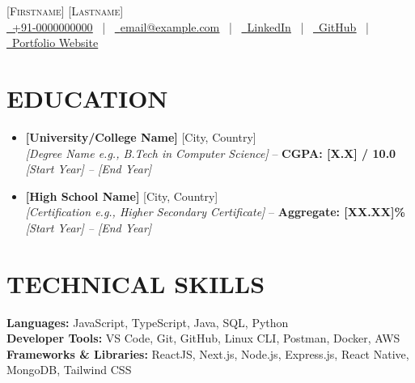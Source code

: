 \documentclass[letterpaper,11pt]{article}
\newcommand{\resumeSubHeadingListStart}{\begin{itemize}[leftmargin=0.0in, label={}]}
\newcommand{\resumeSubHeadingListEnd}{\end{itemize}}
\begin{document}
\begin{center}
    {\Huge \scshape [Firstname] [Lastname]} \\ \vspace{2pt}
    \small
    \href{tel:+910000000000}{\faPhone\ \underline{+91-0000000000}} ~|~
    \href{mailto:email@example.com}{\faEnvelope\ \underline{email@example.com}} ~|~
    \href{https://linkedin.com/}{\faLinkedin\ \underline{LinkedIn}} ~|~
    \href{https://github.com/}{\faGithub\ \underline{GitHub}} ~|~
    \href{https://example.com}{\faGlobe\ \underline{Portfolio Website}}
    \vspace{-10pt}
\end{center}

\section{EDUCATION}
  \resumeSubHeadingListStart
    \item \textbf{[University/College Name]} \hfill [City, Country] \\
    \textit{[Degree Name e.g., B.Tech in Computer Science]} -- \textbf{CGPA: [X.X] / 10.0} \hfill \textit{[Start Year] -- [End Year]}
    \vspace{-6pt}

    \item \textbf{[High School Name]} \hfill [City, Country] \\
    \textit{[Certification e.g., Higher Secondary Certificate]} -- \textbf{Aggregate: [XX.XX]\%} \hfill \textit{[Start Year] -- [End Year]}
  \resumeSubHeadingListEnd
  \vspace{-6pt}

\section{TECHNICAL SKILLS}
 \begin{itemize}[leftmargin=0.0in, label={}]
    \small{\item{
     \textbf{Languages:}{ JavaScript, TypeScript, Java, SQL, Python} \\
     \textbf{Developer Tools:}{ VS Code, Git, GitHub, Linux CLI, Postman, Docker, AWS} \\
     \textbf{Frameworks \& Libraries:}{ ReactJS, Next.js, Node.js, Express.js, React Native, MongoDB, Tailwind CSS}
    }}
 \end{itemize}
 \vspace{-12pt}
\end{document}
